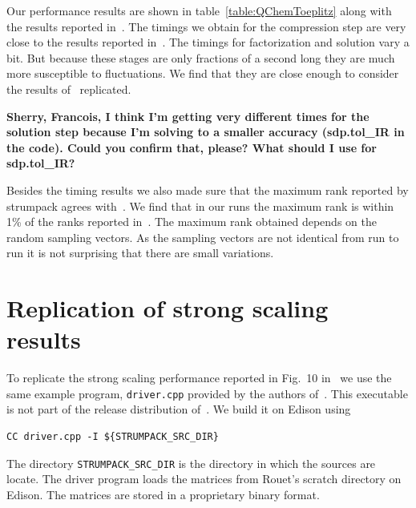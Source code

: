 \documentclass{acmsmall}
\newcommand{\dmcomment}[1]{\textbf{#1}}
\begin{document}
Our performance results are shown in
table~\ref{table:QChemToeplitz} along with the results reported
in~\cite{rouet:strumpack}.  The timings we obtain for the
compression step are very close to the results reported
in~\cite{rouet:strumpack}.  The timings for factorization and
solution vary a bit.  But because these stages are only fractions
of a second long they are much more susceptible to fluctuations.
We find that they are close enough to consider the results
of~\cite{rouet:strumpack} replicated.
\begin{table}
\label{table:QChemToeplitz}
\end{table}
\dmcomment{Sherry, Francois, I think I'm getting very different
  times for the solution step because I'm solving to a smaller
  accuracy (sdp.tol\_IR in the code).  Could you confirm that,
  please?  What should I use for sdp.tol\_IR?}

Besides the timing results we also made sure that the maximum
rank reported by strumpack agrees with~\cite{rouet:strumpack}.
We find that in our runs the maximum rank is within 1\% of the
ranks reported in~\cite{rouet:strumpack}.  The maximum rank
obtained depends on the random sampling vectors.  As the sampling
vectors are not identical from run to run it is not surprising
that there are small variations.


\section{Replication of strong scaling results}

To replicate the strong scaling performance reported in Fig.~10
in~\cite{rouet:strumpack} we use the same example program,
\verb!driver.cpp! provided by the authors
of~\cite{rouet:strumpack}.  This executable is not part of the
release distribution of~\cite{rouet:strumpack}.  We build it on Edison
using
\begin{verbatim}
CC driver.cpp -I ${STRUMPACK_SRC_DIR}
\end{verbatim}
The directory \verb!STRUMPACK_SRC_DIR! is the directory in which
the \strumpack{} sources are locate.  The driver program loads
the matrices from Rouet's scratch directory on Edison.  The
matrices are stored in a proprietary binary format.
\end{document}
